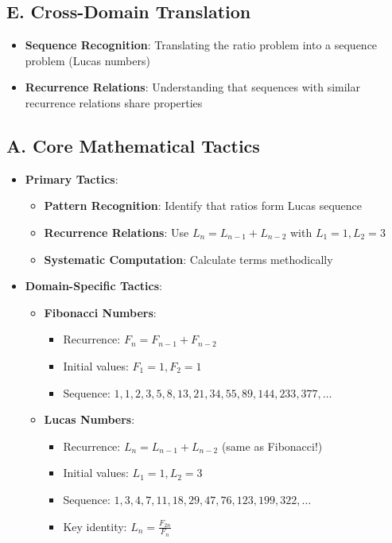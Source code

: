 \documentclass[12pt]{article}
\begin{document}
\begin{strategicbox}
\subsection*{E. Cross-Domain Translation}
\begin{itemize}[leftmargin=*]
    \item \textbf{Sequence Recognition}: Translating the ratio problem into a sequence problem (Lucas numbers)
    
    \item \textbf{Recurrence Relations}: Understanding that sequences with similar recurrence relations share properties
\end{itemize}
\end{strategicbox}

\begin{tacticalbox}
\subsection*{A. Core Mathematical Tactics}
\begin{itemize}[leftmargin=*]
    \item \textbf{Primary Tactics}: 
    \begin{itemize}
        \item \textbf{Pattern Recognition}: Identify that ratios form Lucas sequence
        \item \textbf{Recurrence Relations}: Use $L_n = L_{n-1} + L_{n-2}$ with $L_1=1, L_2=3$
        \item \textbf{Systematic Computation}: Calculate terms methodically
    \end{itemize}
    
    \item \textbf{Domain-Specific Tactics}:
    \begin{itemize}
        \item \textbf{Fibonacci Numbers}:
        \begin{itemize}
            \item Recurrence: $F_n = F_{n-1} + F_{n-2}$
            \item Initial values: $F_1 = 1, F_2 = 1$
            \item Sequence: $1, 1, 2, 3, 5, 8, 13, 21, 34, 55, 89, 144, 233, 377, \ldots$
        \end{itemize}
        
        \item \textbf{Lucas Numbers}:
        \begin{itemize}
            \item Recurrence: $L_n = L_{n-1} + L_{n-2}$ (same as Fibonacci!)
            \item Initial values: $L_1 = 1, L_2 = 3$
            \item Sequence: $1, 3, 4, 7, 11, 18, 29, 47, 76, 123, 199, 322, \ldots$
            \item Key identity: $L_n = \frac{F_{2n}}{F_n}$
        \end{itemize}
        

\end{itemize}
\end{itemize}
\end{tacticalbox}
\end{document}
